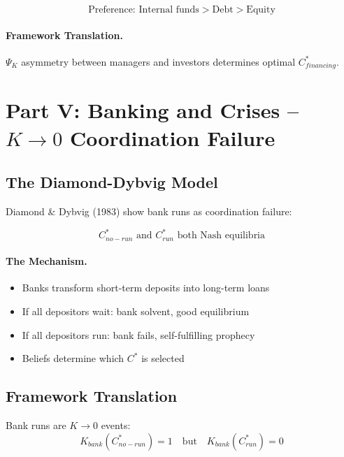 \begin{equation}
\text{Preference: Internal funds} > \text{Debt} > \text{Equity}
\end{equation}

\paragraph{Framework Translation.}
$\Psi_K$ asymmetry between managers and investors determines optimal $C^*_{financing}$.


\section{Part V: Banking and Crises -- $K \to 0$ Coordination Failure}
\label{sec:Y-banking}

\subsection{The Diamond-Dybvig Model}

Diamond \& Dybvig (1983) show bank runs as coordination failure:

\begin{equation}
\boxed{
C^*_{no-run} \text{ and } C^*_{run} \text{ both Nash equilibria}
}
\label{eq:dd}
\end{equation}

\paragraph{The Mechanism.}
\begin{itemize}
    \item Banks transform short-term deposits into long-term loans
    \item If all depositors wait: bank solvent, good equilibrium
    \item If all depositors run: bank fails, self-fulfilling prophecy
    \item Beliefs determine which $C^*$ is selected
\end{itemize}

\subsection{Framework Translation}

Bank runs are $K \to 0$ events:
\begin{equation}
K_{bank}(C^*_{no-run}) = 1 \quad \text{but} \quad K_{bank}(C^*_{run}) = 0
\end{equation}

